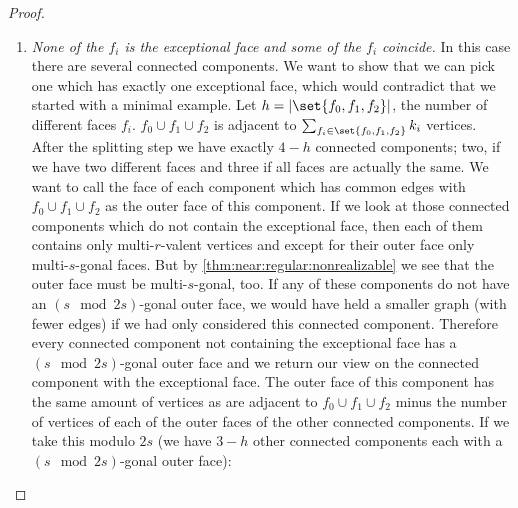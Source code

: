 \begin{proposition}
\begin{proof}
\begin{enumerate}
  \item {\it None of the $f_i$ is the exceptional face and some of the $f_i$ coincide.} In this case there are several connected components. We want to show that we can pick one which has exactly one exceptional face, which would contradict that we started with a minimal example. Let $h = |\set{f_0, f_1, f_2}|$, the number of different faces $f_i$. $f_0 \cup f_1 \cup f_2$ is adjacent to $\sum_{f_i \in \set{f_0, f_1, f_2}} k_i$ vertices. After the splitting step we have exactly $4 - h$ connected components; two, if we have two different faces and three if all faces are actually the same. We want to call the face of each component which has common edges with $f_0 \cup f_1 \cup f_2$ as the outer face of this component. If we look at those connected components which do not contain the exceptional face, then each of them contains only multi-$r$-valent vertices and except for their outer face only multi-$s$-gonal faces. But by \autoref{thm:near:regular:nonrealizable} we see that the outer face must be multi-$s$-gonal, too. If any of these components do not have an $(s \mod 2s)$-gonal outer face, we would have held a smaller graph (with fewer edges) if we had only considered this connected component. Therefore every connected component not containing the exceptional face has a $(s \mod 2s)$-gonal outer face and we return our view on the connected component with the exceptional face. The outer face of this component has the same amount of vertices as are adjacent to $f_0 \cup f_1 \cup f_2$ minus the number of vertices of each of the outer faces of the other connected components. If we take this modulo $2s$ (we have $3 - h$ other connected components each with a $(s \mod 2s)$-gonal outer face):


\end{enumerate}
\end{proof}
\end{proposition}
